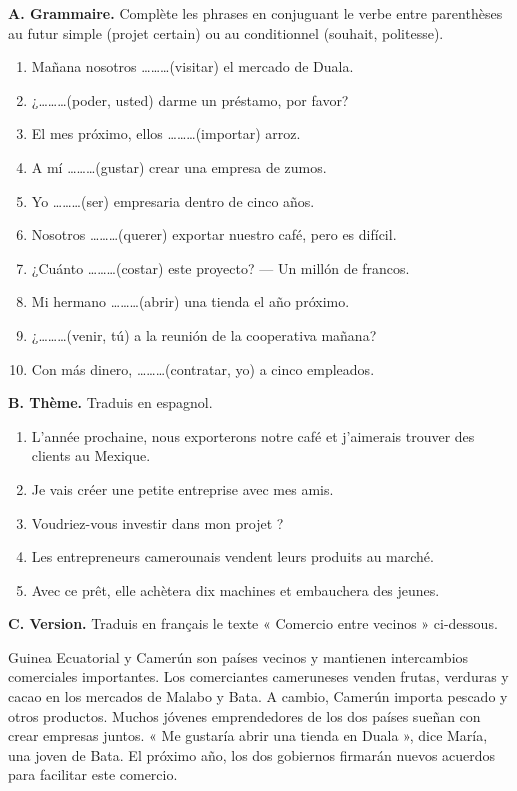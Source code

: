 \documentclass[11pt]{article}
\begin{document}
\begin{exercice}
\textbf{A. Grammaire.} Complète les phrases en conjuguant le verbe entre parenthèses au futur simple (projet certain) ou au conditionnel (souhait, politesse).
\begin{enumerate}
\item Mañana nosotros \ldots\ldots\ldots (visitar) el mercado de Duala.
\item ¿\ldots\ldots\ldots (poder, usted) darme un préstamo, por favor?
\item El mes próximo, ellos \ldots\ldots\ldots (importar) arroz.
\item A mí \ldots\ldots\ldots (gustar) crear una empresa de zumos.
\item Yo \ldots\ldots\ldots (ser) empresaria dentro de cinco años.
\item Nosotros \ldots\ldots\ldots (querer) exportar nuestro café, pero es difícil.
\item ¿Cuánto \ldots\ldots\ldots (costar) este proyecto? — Un millón de francos.
\item Mi hermano \ldots\ldots\ldots (abrir) una tienda el año próximo.
\item ¿\ldots\ldots\ldots (venir, tú) a la reunión de la cooperativa mañana?
\item Con más dinero, \ldots\ldots\ldots (contratar, yo) a cinco empleados.
\end{enumerate}

\textbf{B. Thème.} Traduis en espagnol.
\begin{enumerate}
\item L'année prochaine, nous exporterons notre café et j'aimerais trouver des clients au Mexique.
\item Je vais créer une petite entreprise avec mes amis.
\item Voudriez-vous investir dans mon projet ?
\item Les entrepreneurs camerounais vendent leurs produits au marché.
\item Avec ce prêt, elle achètera dix machines et embauchera des jeunes.
\end{enumerate}

\textbf{C. Version.} Traduis en français le texte « Comercio entre vecinos » ci-dessous.
\end{exercice}

\begin{textebox}
Guinea Ecuatorial y Camerún son países vecinos y mantienen intercambios comerciales importantes. Los comerciantes cameruneses venden frutas, verduras y cacao en los mercados de Malabo y Bata. A cambio, Camerún importa pescado y otros productos. Muchos jóvenes emprendedores de los dos países sueñan con crear empresas juntos. « Me gustaría abrir una tienda en Duala », dice María, una joven de Bata. El próximo año, los dos gobiernos firmarán nuevos acuerdos para facilitar este comercio.
\end{textebox}
\end{document}
